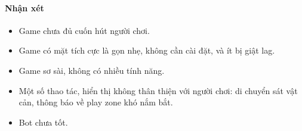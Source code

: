 \documentclass[12pt,a4paper]{article}
\begin{document}
  \paragraph{Nhận xét}\mbox{}

  \begin{itemize}
      \item Game chưa đủ cuốn hút người chơi.
      \item Game có mặt tích cực là gọn nhẹ, không cần cài đặt, và ít bị giật lag.
      \item Game sơ sài, không có nhiều tính năng.
      \item Một số thao tác, hiển thị không thân thiện với người chơi: di chuyển sát vật cản, thông báo về play zone khó nắm bắt.
      \item Bot chưa tốt.
  \end{itemize}

    \newpage
\end{document}
